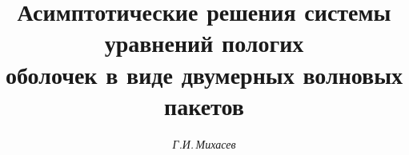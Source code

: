 

  




  


\newcommand{\BP}{\bold P}  


\newcommand{\BB}{\bold B}  


\newcommand{\BX}{\bold X}  


\newcommand{\BL}{\bold L}  


\newcommand{\BQ}{\bold Q}  


\newcommand{\BV}{\bold V}  


\newcommand{\im}{\operatorname{Im}}  


\newcommand{\tr}{\operatorname{tr}}  


\newcommand{\tts}[1]{} 


  




  


\setcounter{page}{47}  












\author{\it Г.И.\,Михасев}  




\title{Асимптотические решения системы уравнений пологих\\ 


оболочек в виде двумерных волновых пакетов}  


 


\date{}  




